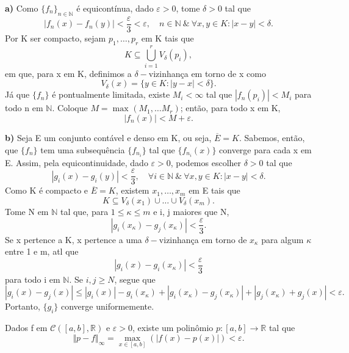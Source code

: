 \documentclass[../analysis_notes.tex]{subfiles}
\begin{document}
\begin{proof*}
	\textbf{a)} Como \(\{f_{n}\}_{n\in \mathbb{N}} \) é equicontínua, dado \(\varepsilon > 0\), tome \(\delta >0\) tal que
	\[
		|f_{n}(x)-f_{n}(y)| < \frac{\varepsilon }{3}<\varepsilon, \quad n\in \mathbb{N}\:\&\: \forall x, y\in K: |x-y|<\delta .
	\]
	Por K ser compacto, sejam \(p_{1}, \dotsc , p_{r}\) em K tais que
	\[
		K\subseteq \bigcup_{i=1}^{r}V_{\delta }(p_{i}),
	\]
	em que, para x em K, definimos a \(\delta-\)vizinhança em torno de x como
	\[
		V_{\delta }(x)=\{y\in K: |y-x|<\delta \}.
	\]
	Já que \(\{f_{n}\}\) é pontualmente limitada, existe \(M_{i}<\infty\) tal que \(|f_{n}(p_{i})|<M_{i}\) para todo n em \(\mathbb{N}\). Coloque \(M=\max_{}(M_{1}, \dotsc M_{r})\); então, para todo x em K,
	\[
		|f_{n}(x)| < M + \varepsilon.
	\]

	\textbf{b)} Seja E um conjunto contável e denso em K, ou seja, \(\overline{E}=K\). Sabemos, então, que \(\{f_{n}\}\) tem uma subsequência \(\{f_{n_{i}}\}\) tal que \(\{f_{n_{i}}(x)\}\) converge para cada x em E. Assim, pela equicontinuidade, dado \(\varepsilon >0\), podemos escolher \(\delta > 0\) tal que
	\[
		|g_{i}(x)-g_{i}(y)| < \frac{\varepsilon}{3},\quad \forall i\in \mathbb{N}\:\&\: \forall x, y\in K: |x-y|<\delta .
	\]
	Como K é compacto e \(\overline{E}=K\), existem \(x_{1}, \dotsc , x_{m}\) em E tais que
	\[
		K\subseteq V_{\delta }(x_{1})\cup \dotsc \cup V_{\delta }(x_{m}).
	\]
	Tome N em \(\mathbb{N}\) tal que, para \(1\leq \kappa \leq m\) e i, j maiores que N,
	\[
		|g_{i}(x_{\kappa }) - g_{j}(x_{\kappa })| < \frac{\varepsilon }{3}.
	\]
	Se x pertence a K, x pertence a uma \(\delta -\)vizinhança em torno de \(x_{\kappa }\) para algum \(\kappa \) entre 1 e m, atl que
	\[
		|g_{i}(x)-g_{i}(x_{\kappa })|<\frac{\varepsilon }{3}
	\]
	para todo i em \(\mathbb{N}.\) Se \(i, j \geq N\), segue que
	\[
		|g_{i}(x)-g_{j}(x)| \leq |g_{i}(x)|-g_{i}(x_{\kappa }) + |g_{i}(x_{\kappa })-g_{j}(x_{\kappa })|+|g_{j}(x_{\kappa })+g_{j}(x)| < \varepsilon .
	\]
	Portanto, \(\{g_{i}\}\) converge uniformemente. \qedsymbol
\end{proof*}
\hypertarget{weierstrass-approximation}{
	\begin{theorem*}
		Dados f em \(\mathcal{C}([a, b], \mathbb{R})\) e \(\varepsilon > 0\), existe um polinômio \(p :[a, b]\rightarrow \mathbb{R}\) tal que
		\[
			\Vert p-f \Vert_{\infty} = \max_{x\in [a, b]}(|f(x)-p(x)|)<\varepsilon .
		\]
	\end{theorem*}
}
\end{document}
